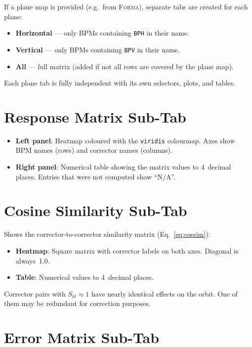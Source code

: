 \documentclass[11pt,a4paper,twoside]{report}
\newcommand{\forma}{\textsc{Forma}}
\begin{document}
If a plane map is provided (e.g.\ from \forma{}), separate tabs are created for each plane:
\begin{itemize}
  \item \textbf{Horizontal} --- only BPMs containing \texttt{BPH} in their name.
  \item \textbf{Vertical} --- only BPMs containing \texttt{BPV} in their name.
  \item \textbf{All} --- full matrix (added if not all rows are covered by the plane map).
\end{itemize}

Each plane tab is fully independent with its own selectors, plots, and tables.

\section{Response Matrix Sub-Tab}

\begin{itemize}
  \item \textbf{Left panel}: Heatmap coloured with the \texttt{viridis} colourmap. Axes show BPM names (rows) and corrector names (columns).
  \item \textbf{Right panel}: Numerical table showing the matrix values to 4~decimal places. Entries that were not computed show ``N/A''.
\end{itemize}

\section{Cosine Similarity Sub-Tab}

Shows the corrector-to-corrector similarity matrix (Eq.~\ref{eq:cossim}):
\begin{itemize}
  \item \textbf{Heatmap}: Square matrix with corrector labels on both axes. Diagonal is always~1.0.
  \item \textbf{Table}: Numerical values to 4~decimal places.
\end{itemize}

\begin{notebox}
Corrector pairs with $S_{kl}\approx1$ have nearly identical effects on the orbit. One of them may be redundant for correction purposes.
\end{notebox}

\section{Error Matrix Sub-Tab}
\end{document}
